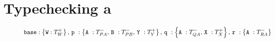 \section{Typechecking a \unit{}}
\label{sec:overview-compiler}



\begin{figure}
    \[
    \mbox{\texttt{base}}
        : \left\{
            \texttt{W}
            : T_W^+
          \right\},\,
    \mbox{\texttt{p}}~:
    \left\{
        \texttt{A}~:T_{PA}^-,\,
        \texttt{B}~:T_{PB}^-,\,
        \texttt{Y}~:T_Y^+
    \right\},\,
    \mbox{\texttt{q}}~:
    \left\{
        \texttt{A}~:T_{QA}^-,\,
        \texttt{X}~:T_X^+
    \right\},\,
    \mbox{\texttt{r}}~:
    \left\{
        \texttt{A}~:T_{RA}^-
    \right\}
    \]


\end{figure}
